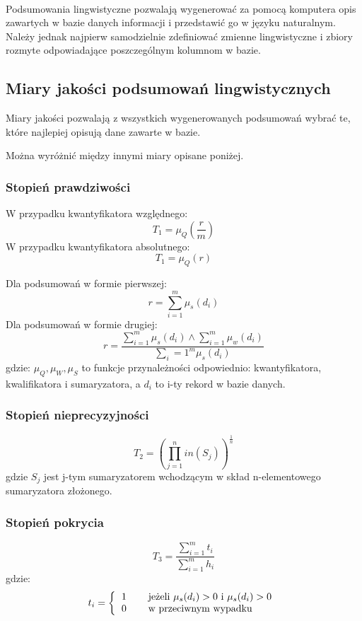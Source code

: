 \documentclass{classrep}
\begin{document}
\paragraph{}
Podsumowania lingwistyczne pozwalają wygenerować za pomocą komputera opis zawartych w bazie danych informacji i przedstawić go w języku naturalnym. Należy jednak najpierw samodzielnie zdefiniować zmienne lingwistyczne i zbiory rozmyte odpowiadające poszczególnym kolumnom w bazie. 

\subsection{Miary jakości podsumowań lingwistycznych}
Miary jakości pozwalają z wszystkich wygenerowanych podsumowań wybrać te, które najlepiej opisują dane zawarte w bazie.

Można wyróżnić między innymi miary opisane poniżej.
\subsubsection{Stopień prawdziwości}
W przypadku kwantyfikatora względnego:
\begin{equation}
T_1 =\mu_Q(\frac{r}{m})
\end{equation}
W przypadku kwantyfikatora absolutnego:
\begin{equation}
T_1 =\mu_Q(r)
\end{equation}

Dla podsumowań w formie pierwszej:
$$r=\sum_{i=1}^m \mu_s(d_i)$$
Dla podsumowań w formie drugiej:
$$r=\frac{\sum_{i=1}^m \mu_s(d_i) \wedge \sum_{i=1}^m \mu_w(d_i)}{\sum_i=1^m \mu_s(d_i)}$$
gdzie:
$\mu_Q, \mu_W, \mu_S$ to funkcje przynależności odpowiednio: kwantyfikatora, kwalifikatora i sumaryzatora, a $d_i$ to i-ty rekord w bazie danych. 

\subsubsection{Stopień nieprecyzyjności}
\begin{equation}
T_2=(\prod_{j=1}^n in(S_j))^{\frac{1}{n}}
\end{equation}
gdzie $S_j$ jest j-tym sumaryzatorem wchodzącym w skład n-elementowego sumaryzatora złożonego.  

\subsubsection{Stopień pokrycia}
\begin{equation}
T_3=\frac{\sum_{i=1}^m t_i}{\sum_{i=1}^m h_i}
\end{equation}
gdzie:\\
\begin{equation}
t_i = \left\{
\begin{tabular}{l l}
1 & \quad \mbox{jeżeli $\mu_s(d_i) > 0$ i $\mu_s(d_i) > 0$}\\
 0 & \quad \mbox{w przeciwnym wypadku}\\ 
\end{tabular} \right .
\end{equation}
\end{document}

